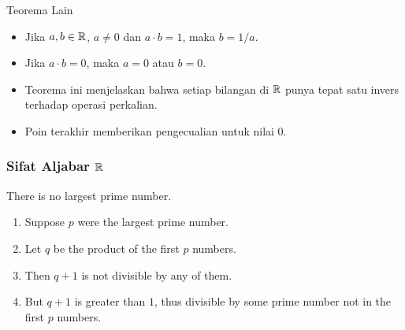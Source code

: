 \documentclass{beamer}
\begin{document}
\begin{frame}{Teorema Lain}
    \begin{tcolorbox}[enhanced,title=Teorema 2.1.3 (Terkait Invers), frame style tile={width=\paperwidth}{\wallpaper}]
        \begin{itemize}
            \item Jika $a,b \in \mathbb{R}$, $a \neq 0$ dan $a \cdot b = 1$, maka $b = 1/a$.
            \item Jika $a \cdot b = 0$, maka $a = 0$ atau $b = 0$.
        \end{itemize}
    \end{tcolorbox}
    \begin{itemize}
        \item Teorema ini menjelaskan bahwa setiap bilangan di $\mathbb{R}$ punya tepat satu invers terhadap operasi perkalian.
        \item Poin terakhir memberikan pengecualian untuk nilai $0$.
    \end{itemize}
\end{frame}


\begin{frame} 
\frametitle{Sifat Aljabar $\mathbb{R}$} 
\begin{theorem}
There is no largest prime number. \end{theorem} 
\begin{enumerate} 
\item<1-| alert@1> Suppose $p$ were the largest prime number. 
\item<2-> Let $q$ be the product of the first $p$ numbers. 
\item<3-> Then $q+1$ is not divisible by any of them. 
\item<1-> But $q + 1$ is greater than $1$, thus divisible by some prime
number not in the first $p$ numbers.
\end{enumerate}
\end{frame}
\end{document}
